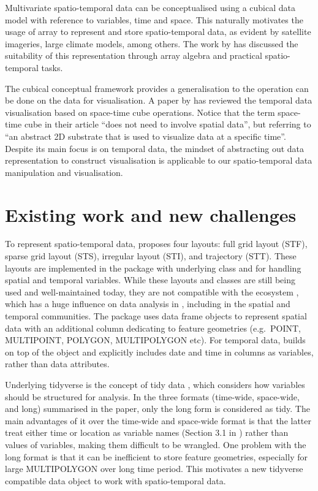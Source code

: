 \documentclass[
]{jss}
\begin{document}
Multivariate spatio-temporal data can be conceptualised using a cubical
data model with reference to variables, time and space. This naturally
motivates the usage of array to represent and store spatio-temporal
data, as evident by satellite imageries, large climate models, among
others. The work by \citet{lu_multidimensional_2018} has discussed the
suitability of this representation through array algebra and practical
spatio-temporal tasks.

The cubical conceptual framework provides a generalisation to the
operation can be done on the data for visualisation. A paper by
\citet{bach_review_2014} has reviewed the temporal data visualisation
based on space-time cube operations. Notice that the term space-time
cube in their article ``does not need to involve spatial data'', but
referring to ``an abstract 2D substrate that is used to visualize data
at a specific time''. Despite its main focus is on temporal data, the
mindset of abstracting out data representation to construct
visualisation is applicable to our spatio-temporal data manipulation and
visualisation.

\hypertarget{existing-work-and-new-challenges}{%
\section{Existing work and new
challenges}\label{existing-work-and-new-challenges}}

To represent spatio-temporal data, \citet{spacetime} proposes four
layouts: full grid layout (STF), sparse grid layout (STS), irregular
layout (STI), and trajectory (STT). These layouts are implemented in the
 package with underlying class  \citep{sp} and
 \citep{xts} for handling spatial and temporal variables. While
these layouts and classes are still being used and well-maintained
today, they are not compatible with the  ecosystem
\citep{tidyverse}, which has a huge influence on data analysis in
, including in the spatial and temporal communities. The
package  \citep{sf} uses data frame objects to represent spatial
data with an additional  column dedicating to feature
geometries \citep{jr_herring_opengis_2011} (e.g.~POINT, MULTIPOINT,
POLYGON, MULTIPOLYGON etc). For temporal data, 
\citep{tsibble} builds on top of the  \citep{tibble} object
and explicitly includes date and time in columns as variables, rather
than data attributes.

Underlying tidyverse is the concept of tidy data \citep{tidydata}, which
considers how variables should be structured for analysis. In the three
formats (time-wide, space-wide, and long) summarised in the
\citet{spacetime} paper, only the long form is considered as tidy. The
main advantages of it over the time-wide and space-wide format is that
the latter treat either time or location as variable names (Section 3.1
in \citet{tidydata}) rather than values of variables, making them
difficult to be wrangled. One problem with the long format is that it
can be inefficient to store feature geometries, especially for large
MULTIPOLYGON over long time period. This motivates a new tidyverse
compatible data object to work with spatio-temporal data.
\end{document}
